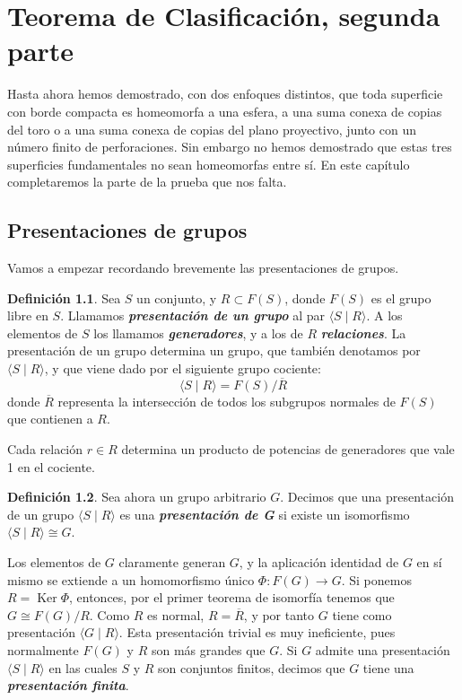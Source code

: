 \documentclass[10pt]{report}
\DeclareMathOperator{\Ker}{Ker}
\newcommand{\enfatiza}[1]{\textbf{\textit{#1}}}
\theoremstyle{definition}
\newtheorem{defin}{Definición}[section]
\begin{document}
\chapter{Teorema de Clasificación, segunda parte}
Hasta ahora hemos demostrado, con dos enfoques distintos, que toda superficie con borde compacta es homeomorfa a una esfera, a una suma conexa de copias del toro o a una suma conexa de copias del plano proyectivo, junto con un número finito de perforaciones. Sin embargo no hemos demostrado que estas tres superficies fundamentales no sean homeomorfas entre sí. En este capítulo completaremos la parte de la prueba que nos falta. 

\section{Presentaciones de grupos}
Vamos a empezar recordando brevemente las presentaciones de grupos. 

\begin{defin}
Sea $S$ un conjunto, y $R\subset F(S)$, donde $F(S)$ es el grupo libre en $S$. Llamamos \enfatiza{presentación de un grupo} al par $\langle S \mid R\rangle$. A los elementos de $S$ los llamamos \enfatiza{generadores}, y a los de $R$ \enfatiza{relaciones}. La presentación de un grupo determina un grupo, que también denotamos por $\langle S \mid R \rangle$, y que viene dado por el siguiente grupo cociente: 
\[
\langle S\mid R\rangle = F(S)/\overline{R}
\]
donde $\overline{R}$ representa la intersección de todos los subgrupos normales de $F(S)$ que contienen a $R$.
\end{defin}
Cada relación $r\in R$ determina un producto de potencias de generadores que vale 1 en el cociente.
\begin{defin}
Sea ahora un grupo arbitrario $G$. Decimos que una presentación de un grupo $\langle S \mid R \rangle$ es una \enfatiza{presentación de G} si existe un isomorfismo $\langle S \mid R\rangle \cong G$. 
\end{defin}
Los elementos de $G$ claramente generan $G$, y la aplicación identidad de $G$ en sí mismo se extiende a un homomorfismo único $\Phi: F(G) \to G$. Si ponemos $R= \Ker{\Phi}$, entonces, por el primer teorema de isomorfía tenemos que $G\cong F(G)/R$. Como $R$ es normal, $R=\overline{R}$, y por tanto $G$ tiene como presentación $\langle G\mid R\rangle$. Esta presentación trivial es muy ineficiente, pues normalmente $F(G)$ y $R$ son más grandes que $G$. 
Si $G$ admite una presentación $\langle S\mid R	\rangle$ en las cuales $S$ y $R$ son conjuntos finitos, decimos que $G$ tiene una \enfatiza{presentación finita}.
\end{document}
